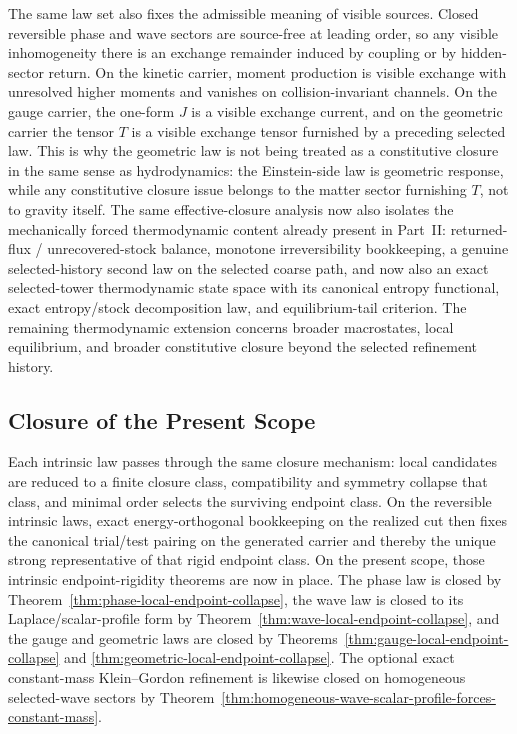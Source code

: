The same law set also fixes the admissible meaning of visible sources. Closed
reversible phase and wave sectors are source-free at leading order, so any
visible inhomogeneity there is an exchange remainder induced by coupling or by
hidden-sector return. On the kinetic carrier, moment production is visible
exchange with unresolved higher moments and vanishes on collision-invariant
channels. On the gauge carrier, the one-form \(J\) is a visible exchange
current, and on the geometric carrier the tensor \(T\) is a visible exchange
tensor furnished by a preceding selected law. This is why the geometric law
is not being treated as a constitutive closure in the same sense as
hydrodynamics: the Einstein-side law is geometric response, while any
constitutive closure issue belongs to the matter sector furnishing \(T\), not
to gravity itself. The same effective-closure analysis now also isolates the
mechanically forced thermodynamic content already present in Part~II:
returned-flux / unrecovered-stock balance, monotone irreversibility
bookkeeping, a genuine selected-history second law on the selected coarse
path, and now also an exact selected-tower thermodynamic state space with its
canonical entropy functional, exact entropy/stock decomposition law, and
equilibrium-tail criterion. The remaining thermodynamic extension concerns
broader macrostates, local equilibrium, and broader constitutive closure
beyond the selected refinement history.

\subsection{Closure of the Present Scope}

Each intrinsic law passes through the same closure mechanism: local
candidates are reduced to a finite closure class, compatibility and
symmetry collapse that class, and minimal order selects the surviving
endpoint class. On the reversible intrinsic laws, exact energy-orthogonal
bookkeeping on the realized cut then fixes the canonical trial/test pairing
on the generated carrier and thereby the unique strong representative of that
rigid endpoint class. On the present scope, those intrinsic
endpoint-rigidity theorems are now in place. The phase law is closed by
Theorem~\ref{thm:phase-local-endpoint-collapse}, the wave law is closed to its
Laplace/scalar-profile form by
Theorem~\ref{thm:wave-local-endpoint-collapse}, and the gauge and geometric
laws are closed by
Theorems~\ref{thm:gauge-local-endpoint-collapse} and
\ref{thm:geometric-local-endpoint-collapse}. The optional exact constant-mass
Klein--Gordon refinement is likewise closed on homogeneous selected-wave
sectors by
Theorem~\ref{thm:homogeneous-wave-scalar-profile-forces-constant-mass}.

